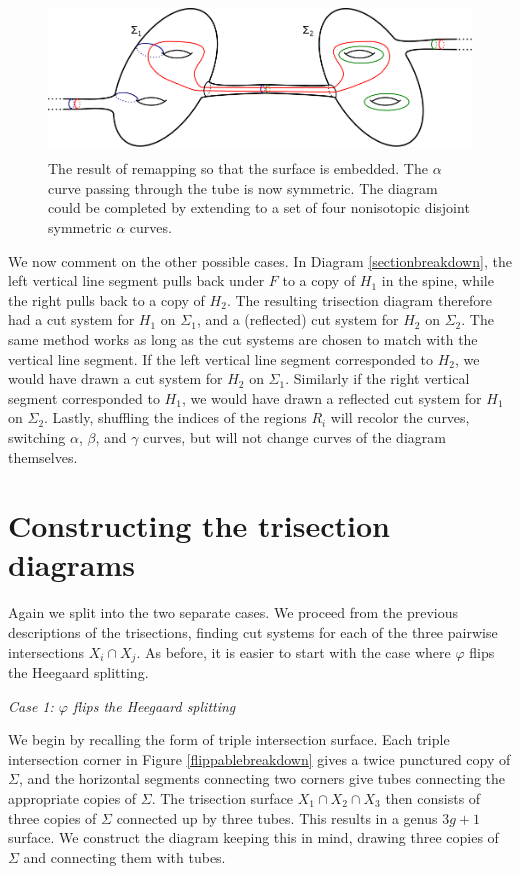 \documentclass[12pt]{amsart}
\theoremstyle{definition}
\theoremstyle{remark}
\begin{document}
\begin{figure}[h]
\centering
\includegraphics[height=1.6in]{coresubsurfacediagram_embedded.png}
\caption{The result of remapping so that the surface is embedded.  The $\alpha$ curve passing through the tube is now symmetric.  The diagram could be completed by extending to a set of four nonisotopic disjoint symmetric $\alpha$ curves.}
\label{fig_coresubsurfacediagram_embedded}
\end{figure}

We now comment on the other possible cases.  In Diagram \ref{sectionbreakdown}, the left vertical line segment pulls back under $F$ to a copy of $H_1$ in the spine, while the right pulls back to a copy of $H_2$.  The resulting trisection diagram therefore had a cut system for $H_1$ on $\Sigma_1$, and a (reflected) cut system for $H_2$ on $\Sigma_2$.  The same method works as long as the cut systems are chosen to match with the vertical line segment.  If the left vertical line segment corresponded to $H_2$, we would have drawn a cut system for $H_2$ on $\Sigma_1$.  Similarly if the right vertical segment corresponded to $H_1$, we would have drawn a reflected cut system for $H_1$ on $\Sigma_2$.  Lastly, shuffling the indices of the regions $R_i$ will recolor the curves, switching $\alpha$, $\beta$, and $\gamma$ curves, but will not change curves of the diagram themselves.

\section{Constructing the trisection diagrams}
\label{sec_diagrams}

Again we split into the two separate cases.  We proceed from the previous descriptions of the trisections, finding cut systems for each of the three pairwise intersections $X_i \cap X_j$.  As before, it is easier to start with the case where $\varphi$ flips the Heegaard splitting.

\smallskip
\noindent\textit{Case 1: $\varphi$ flips the Heegaard splitting}\ \ 

We begin by recalling the form of triple intersection surface.  Each triple intersection corner in Figure \ref{flippablebreakdown} gives a twice punctured copy of $\Sigma$, and the horizontal segments connecting two corners give tubes connecting the appropriate copies of $\Sigma$.  The trisection surface $X_1 \cap X_2 \cap X_3$ then consists of three copies of $\Sigma$ connected up by three tubes.  This results in a genus $3g+1$ surface.  We construct the diagram keeping this in mind, drawing three copies of $\Sigma$ and connecting them with tubes.  
\end{document}
